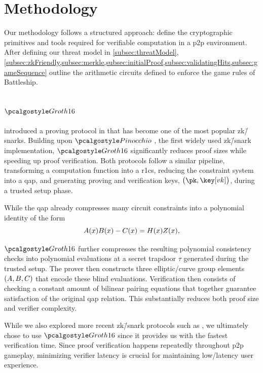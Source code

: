 \section{Methodology}
\label{sec:methodology}

Our methodology follows a structured approach:  define the cryptographic primitives and tools required for verifiable computation in a \gls{p2p} environment. After defining our threat model in \cref{subsec:threatModel}, \cref{subsec:zkFriendly,subsec:merkle,subsec:initialProof,subsec:validatingHits,subsec:gameSequence} outline the arithmetic circuits defined to enforce the game rules of Battleship.

\subsection{\texorpdfstring{$\groth$}{Groth16}}
\label{subsec:groth}

\textcite{groth16} introduced a proving protocol in \citeyear{groth16} that has become one of the most popular \gls{zk}\=/\glspl{snark}. Building upon $\pinocchio$ \cite{parno13}, the first widely used \gls{zk}\=/\gls{snark} implementation, $\groth$ significantly reduces proof sizes while speeding up proof verification. Both protocols follow a similar pipeline, transforming a computation function into a \gls{r1cs}, reducing the constraint system into a \gls{qap}, and generating proving and verification keys, $\del{\pk, \vkey}$, during a trusted setup phase.

While the \gls{qap} already compresses many circuit constraints into a polynomial identity of the form
\begin{equation*}
    A\del{x}B\del{x} - C\del{x} = H\del{x}Z\del{x},
\end{equation*}

\noindent $\groth$ further compresses the resulting polynomial consistency checks into polynomial evaluations at a secret trapdoor $\tau$ generated during the trusted setup. The prover then constructs three elliptic\-/curve group elements $\left(A, B, C\right)$ that encode these blind evaluations. Verification then consists of checking a constant amount of bilinear pairing equations that together guarantee satisfaction of the original \gls{qap} relation. This substantially reduces both proof size and verifier complexity.

While we also explored more recent \gls{zk}\=/\gls{snark} protocols such as  \cite{gabizon19}, we ultimately chose to use $\groth$ since it provides us with the fastest verification time. Since proof verification happens repeatedly throughout \gls{p2p} gameplay, minimizing verifier latency is crucial for maintaining low\-/latency user experience.

